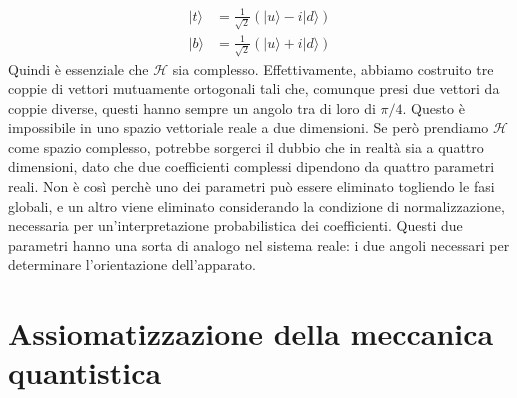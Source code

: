 \documentclass[a4paper, 11pt]{article}
\renewcommand{\H}{\mathcal{H}}
\renewcommand{\ket}[1]{| #1\rangle}
\begin{document}
	\begin{align*}
	\ket{t}&=\frac{1}{\sqrt{2}}\left(\ket{u}-i\ket{d}\right)\\
	\ket{b}&=\frac{1}{\sqrt{2}}\left(\ket{u}+i\ket{d}\right)
	\end{align*}	
	Quindi è essenziale che $\H$ sia complesso. Effettivamente, abbiamo costruito tre coppie di vettori mutuamente ortogonali tali che, comunque presi due vettori da coppie diverse, questi hanno sempre un angolo tra di loro di $\pi/4$. Questo è impossibile in uno spazio vettoriale reale a due dimensioni. Se però prendiamo $\H$ come spazio complesso, potrebbe sorgerci il dubbio che in realtà sia a quattro dimensioni, dato che due coefficienti complessi dipendono da quattro parametri reali. Non è così perchè uno dei parametri può essere eliminato togliendo le fasi globali, e un altro viene eliminato considerando la condizione di normalizzazione, necessaria per un'interpretazione probabilistica dei coefficienti. Questi due parametri hanno una sorta di analogo nel sistema reale: i due angoli necessari per determinare l'orientazione dell'apparato.
	\newpage
	\section{Assiomatizzazione della meccanica quantistica}
\end{document}
